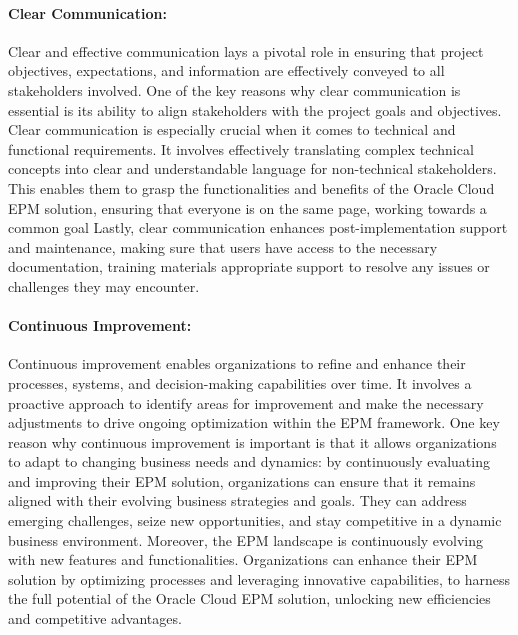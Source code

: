 \documentclass[12pt,a4paper,openright,twoside]{book}
\begin{document}
\paragraph{Clear Communication:}
Clear and effective communication lays a pivotal role in ensuring that project objectives, expectations, and information are effectively conveyed to all stakeholders involved.  
%
One of the key reasons why clear communication is essential is its ability to align stakeholders with the project goals and objectives.
%
Clear communication is especially crucial when it comes to technical and functional requirements. 
%
It involves effectively translating complex technical concepts into clear and understandable language for non-technical stakeholders. 
%
This enables them to grasp the functionalities and benefits of the Oracle Cloud EPM solution, ensuring that everyone is on the same page, working towards a common goal
%
Lastly, clear communication enhances post-implementation support and maintenance, making sure that users have access to the necessary documentation, training materials appropriate support to resolve any issues or challenges they may encounter.

\paragraph{Continuous Improvement:}
Continuous improvement enables organizations to refine and enhance their processes, systems, and decision-making capabilities over time. 
%
It involves a proactive approach to identify areas for improvement and make the necessary adjustments to drive ongoing optimization within the EPM framework. 
%
One key reason why continuous improvement is important is that it allows organizations to adapt to changing business needs and dynamics: by continuously evaluating and improving their EPM solution, organizations can ensure that it remains aligned with their evolving business strategies and goals.
%
They can address emerging challenges, seize new opportunities, and stay competitive in a dynamic business environment.
%
Moreover, the EPM landscape is continuously evolving with new features and functionalities. 
%
Organizations can enhance their EPM solution by optimizing processes and leveraging innovative capabilities, to harness the full potential of the Oracle Cloud EPM solution, unlocking new efficiencies and competitive advantages.\\
\end{document}
